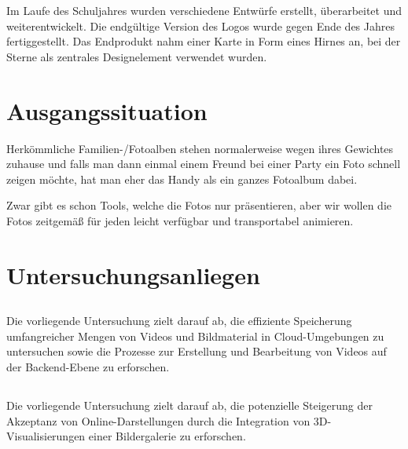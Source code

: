 Im Laufe des Schuljahres wurden verschiedene Entwürfe erstellt, überarbeitet und 
weiterentwickelt. Die endgültige Version des Logos wurde gegen Ende des Jahres 
fertiggestellt. Das Endprodukt nahm einer Karte in Form eines Hirnes an, bei der 
Sterne als zentrales Designelement verwendet wurden.



\section{Ausgangssituation}

Herkömmliche Familien-/Fotoalben stehen normalerweise wegen ihres Gewichtes 
zuhause und falls man dann einmal einem Freund bei einer Party ein Foto schnell 
zeigen möchte, hat man eher das Handy als ein ganzes Fotoalbum dabei.

Zwar gibt es schon Tools, welche die Fotos nur präsentieren, 
aber wir wollen die Fotos zeitgemä\ss{} für jeden leicht verfügbar und transportabel animieren.

\section{Untersuchungsanliegen}

\subsection{\firstauthor}

Die vorliegende Untersuchung zielt darauf ab, die effiziente Speicherung 
umfangreicher Mengen von Videos und Bildmaterial in Cloud-Umgebungen zu 
untersuchen sowie die Prozesse zur Erstellung und Bearbeitung von Videos 
auf der Backend-Ebene zu erforschen.

\subsection{\secondauthor}

Die vorliegende Untersuchung zielt darauf ab, die potenzielle Steigerung 
der Akzeptanz von Online-Darstellungen durch die Integration von 
3D-Visualisierungen einer Bildergalerie zu erforschen.

